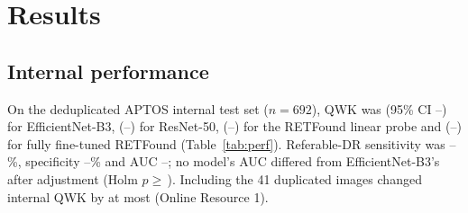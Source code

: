 \documentclass[pdflatex,sn-basic,Numbered]{sn-jnl}
\begin{document}
\section{Results}\label{sec:results}

\subsection{Internal performance}

On the deduplicated APTOS internal test set ($n=692$), QWK was  (95\% CI --) for EfficientNet-B3,  (--) for ResNet-50,  (--) for the RETFound linear probe and  (--) for fully fine-tuned RETFound (Table~\ref{tab:perf}). Referable-DR sensitivity was --\%, specificity --\% and AUC --; no model's AUC differed from EfficientNet-B3's after adjustment (Holm $p\ge$\,). Including the 41 duplicated images changed internal QWK by at most  (Online Resource 1).
\end{document}
